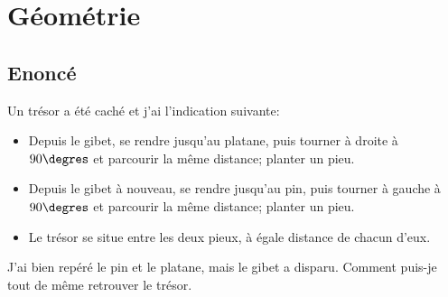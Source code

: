\documentclass{article}
\newenvironment{statement}{\subsection{Enoncé}}{\pagebreak}
\begin{document}
\section{Géométrie}
\begin{statement}
Un trésor a été caché et j'ai l'indication suivante:
\begin{itemize}
\item
Depuis le gibet, se rendre jusqu'au platane, puis tourner à droite à $90\degres$ et parcourir la même distance; planter un pieu.
\item
Depuis le gibet à nouveau, se rendre jusqu'au pin, puis tourner à gauche à $90\degres$ et parcourir la même distance; planter un pieu.
\item
Le trésor se situe entre les deux pieux, à égale distance de chacun d'eux.
\end{itemize}
J'ai bien repéré le pin et le platane, mais le gibet a disparu. Comment puis-je tout de même retrouver le trésor.
\end{statement}
\end{document}

